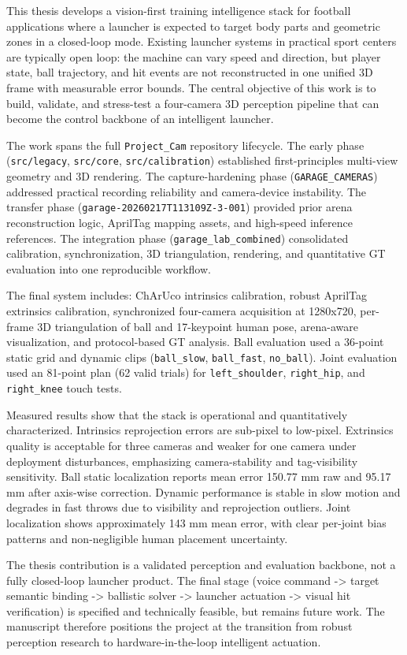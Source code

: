 This thesis develops a vision-first training intelligence stack for football applications where a launcher is expected to target body parts and geometric zones in a closed-loop mode. Existing launcher systems in practical sport centers are typically open loop: the machine can vary speed and direction, but player state, ball trajectory, and hit events are not reconstructed in one unified 3D frame with measurable error bounds. The central objective of this work is to build, validate, and stress-test a four-camera 3D perception pipeline that can become the control backbone of an intelligent launcher.

The work spans the full \texttt{Project\_Cam} repository lifecycle. The early phase (\texttt{src/legacy}, \texttt{src/core}, \texttt{src/calibration}) established first-principles multi-view geometry and 3D rendering. The capture-hardening phase (\texttt{GARAGE\_CAMERAS}) addressed practical recording reliability and camera-device instability. The transfer phase (\texttt{garage-20260217T113109Z-3-001}) provided prior arena reconstruction logic, AprilTag mapping assets, and high-speed inference references. The integration phase (\texttt{garage\_lab\_combined}) consolidated calibration, synchronization, 3D triangulation, rendering, and quantitative GT evaluation into one reproducible workflow.

The final system includes: ChArUco intrinsics calibration, robust AprilTag extrinsics calibration, synchronized four-camera acquisition at 1280x720, per-frame 3D triangulation of ball and 17-keypoint human pose, arena-aware visualization, and protocol-based GT analysis. Ball evaluation used a 36-point static grid and dynamic clips (\texttt{ball\_slow}, \texttt{ball\_fast}, \texttt{no\_ball}). Joint evaluation used an 81-point plan (62 valid trials) for \texttt{left\_shoulder}, \texttt{right\_hip}, and \texttt{right\_knee} touch tests.

Measured results show that the stack is operational and quantitatively characterized. Intrinsics reprojection errors are sub-pixel to low-pixel. Extrinsics quality is acceptable for three cameras and weaker for one camera under deployment disturbances, emphasizing camera-stability and tag-visibility sensitivity. Ball static localization reports mean error 150.77 mm raw and 95.17 mm after axis-wise correction. Dynamic performance is stable in slow motion and degrades in fast throws due to visibility and reprojection outliers. Joint localization shows approximately 143 mm mean error, with clear per-joint bias patterns and non-negligible human placement uncertainty.

The thesis contribution is a validated perception and evaluation backbone, not a fully closed-loop launcher product. The final stage (voice command -> target semantic binding -> ballistic solver -> launcher actuation -> visual hit verification) is specified and technically feasible, but remains future work. The manuscript therefore positions the project at the transition from robust perception research to hardware-in-the-loop intelligent actuation.
